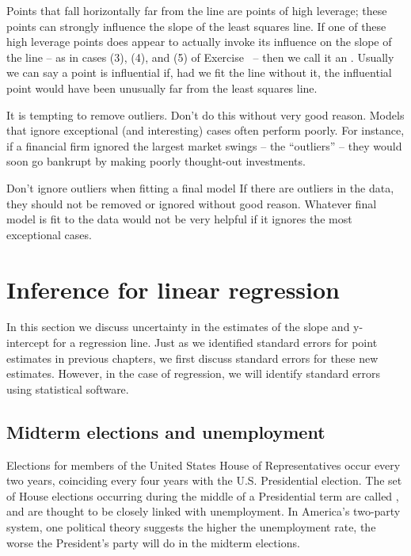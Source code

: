 Points that fall horizontally far from the line are points of high leverage; these points can strongly influence the slope of the least squares line. If one of these high leverage points does appear to actually invoke its influence on the slope of the line -- as in cases (3), (4), and (5) of Exercise~ -- then we call it an . Usually we can say a point is influential if, had we fit the line without it, the influential point would have been unusually far from the least squares line.

It is tempting to remove outliers. Don't do this without very good reason. Models that ignore exceptional (and interesting) cases often perform poorly. For instance, if a financial firm ignored the largest market swings -- the ``outliers'' --  they would soon go bankrupt by making poorly thought-out investments.

\begin{caution}{Don't ignore outliers when fitting a final model}
{If there are outliers in the data, they should not be removed or ignored without good reason. Whatever final model is fit to the data would not be very helpful if it ignores the most exceptional cases.}
\end{caution}

\section{Inference for linear regression}
\label{inferenceForLinearRegression}

In this section we discuss uncertainty in the estimates of the slope and y-intercept for a regression line. Just as we identified standard errors for point estimates in previous chapters, we first discuss standard errors for these new estimates. However, in the case of regression, we will identify standard errors using statistical software.

\subsection{Midterm elections and unemployment}

Elections for members of the United States House of Representatives occur every two years, coinciding every four years with the U.S. Presidential election. The set of House elections occurring during the middle of a Presidential term are called , and are thought to be closely linked with unemployment. In America's two-party system, one political theory suggests the higher the unemployment rate, the worse the President's party will do in the midterm elections.

